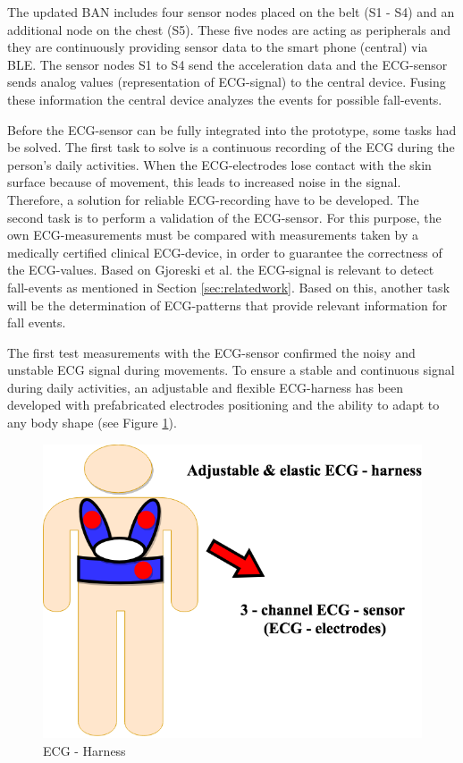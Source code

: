 \documentclass[review]{elsarticle}
\begin{document}
The updated BAN includes four sensor nodes placed on the belt (S1 - S4) and an additional node on the chest (S5). These five nodes are acting as peripherals and they are continuously providing sensor data to the smart phone (central) via BLE. The sensor nodes S1 to S4 send the acceleration data and the ECG-sensor sends analog values (representation of ECG-signal) to the central device. Fusing these information the central device analyzes the events for possible fall-events.

Before the ECG-sensor can be fully integrated into the prototype, some tasks had be solved. The first task to solve is a continuous recording of the ECG during the person's daily activities. When the ECG-electrodes lose contact with the skin surface because of movement, this leads to increased noise in the signal. Therefore, a solution for reliable ECG-recording have to be developed. The second task is to perform a validation of the ECG-sensor. For this purpose, the own ECG-measurements must be compared with measurements taken by a medically certified clinical ECG-device, in order to guarantee the correctness of the ECG-values. Based on Gjoreski et al. \cite{Gjoreski2014} the ECG-signal is relevant to detect fall-events as mentioned in Section \ref{sec:relatedwork}. Based on this, another task will be the determination of ECG-patterns that provide relevant information for fall events.

The first test measurements with the ECG-sensor confirmed the noisy and unstable ECG signal during movements. To ensure a stable and continuous signal during daily activities, an adjustable and flexible ECG-harness has been developed with prefabricated electrodes positioning and the ability to adapt to any body shape (see Figure \ref{fig:ECGHarness}).
\begin{figure}[!ht]
	\centering
	\includegraphics[scale=0.32]{Images/ECG-Harness.png}
	\caption[ECG - Harness]{ECG - Harness}
	\label{fig:ECGHarness}
\end{figure}
\end{document}
